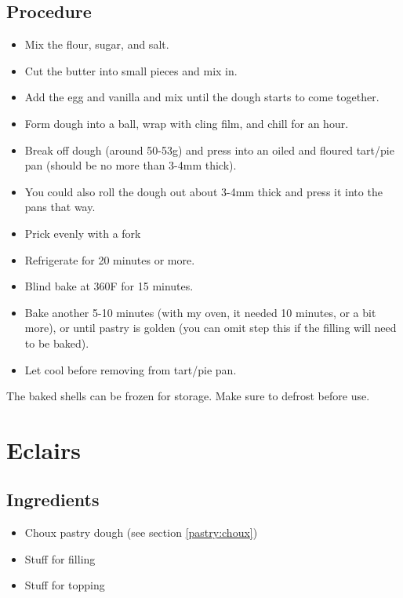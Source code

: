 \documentclass[10pt, openany]{book}
\begin{document}
\subsection{Procedure}
\begin{itemize}
  \item Mix the flour, sugar, and salt.
  \item Cut the butter into small pieces and mix in.
  \item Add the egg and vanilla and mix until the dough starts to come together.
  \item Form dough into a ball, wrap with cling film, and chill for an hour.
  \item Break off dough (around 50-53g) and press into an oiled and floured tart/pie pan (should be no more than 3-4mm thick).
  \item You could also roll the dough out about 3-4mm thick and press it into the pans that way.
  \item Prick evenly with a fork
  \item Refrigerate for 20 minutes or more.
  \item Blind bake at 360\degrees{}F for 15 minutes.
  \item Bake another 5-10 minutes (with my oven, it needed 10 minutes, or a bit more), or until pastry is golden (you can omit step this if the filling will need to be baked).
  \item Let cool before removing from tart/pie pan.
\end{itemize}
The baked shells can be frozen for storage.  Make sure to defrost before use.

\section{Eclairs}
\label{pastry:Eclair}
\subsection{Ingredients}
\begin{itemize}
  \item Choux pastry dough (see section \ref{pastry:choux})
  \item Stuff for filling
  \item Stuff for topping
\end{itemize}
\end{document}
